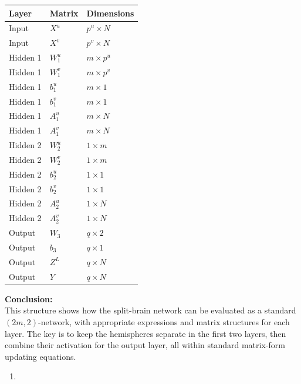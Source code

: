\documentclass[
]{article}
\providecommand{\tightlist}{%
  \setlength{\itemsep}{0pt}\setlength{\parskip}{0pt}}
\begin{document}
\begin{longtable}[]{@{}lll@{}}
\toprule\noalign{}
Layer & Matrix & Dimensions \\
\midrule\noalign{}
\endhead
\bottomrule\noalign{}
\endlastfoot
Input & \(X^u\) & \(p^u \times N\) \\
Input & \(X^v\) & \(p^v \times N\) \\
Hidden 1 & \(W^u_1\) & \(m \times p^u\) \\
Hidden 1 & \(W^v_1\) & \(m \times p^v\) \\
Hidden 1 & \(b^u_1\) & \(m \times 1\) \\
Hidden 1 & \(b^v_1\) & \(m \times 1\) \\
Hidden 1 & \(A^u_1\) & \(m \times N\) \\
Hidden 1 & \(A^v_1\) & \(m \times N\) \\
Hidden 2 & \(W^u_2\) & \(1 \times m\) \\
Hidden 2 & \(W^v_2\) & \(1 \times m\) \\
Hidden 2 & \(b^u_2\) & \(1 \times 1\) \\
Hidden 2 & \(b^v_2\) & \(1 \times 1\) \\
Hidden 2 & \(A^u_2\) & \(1 \times N\) \\
Hidden 2 & \(A^v_2\) & \(1 \times N\) \\
Output & \(W_3\) & \(q \times 2\) \\
Output & \(b_3\) & \(q \times 1\) \\
Output & \(Z^L\) & \(q \times N\) \\
Output & \(Y\) & \(q \times N\) \\
\end{longtable}

\textbf{Conclusion:}\\
This structure shows how the split-brain network can be evaluated as a
standard \((2m, 2)\)-network, with appropriate expressions and matrix
structures for each layer. The key is to keep the hemispheres separate
in the first two layers, then combine their activation for the output
layer, all within standard matrix-form updating equations.

\begin{enumerate}
\def\labelenumi{\alph{enumi}.}
\setcounter{enumi}{4}
\tightlist
\item
\end{enumerate}
\end{document}
